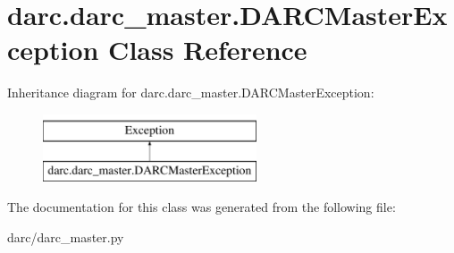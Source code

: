 \hypertarget{classdarc_1_1darc__master_1_1_d_a_r_c_master_exception}{}\section{darc.\+darc\+\_\+master.\+D\+A\+R\+C\+Master\+Exception Class Reference}
\label{classdarc_1_1darc__master_1_1_d_a_r_c_master_exception}
Inheritance diagram for darc.\+darc\+\_\+master.\+D\+A\+R\+C\+Master\+Exception\+:\begin{figure}[H]
\begin{center}
\leavevmode
\includegraphics[height=2.000000cm]{classdarc_1_1darc__master_1_1_d_a_r_c_master_exception}
\end{center}
\end{figure}


The documentation for this class was generated from the following file\+:\begin{DoxyCompactItemize}
\item 
darc/darc\+\_\+master.\+py\end{DoxyCompactItemize}
